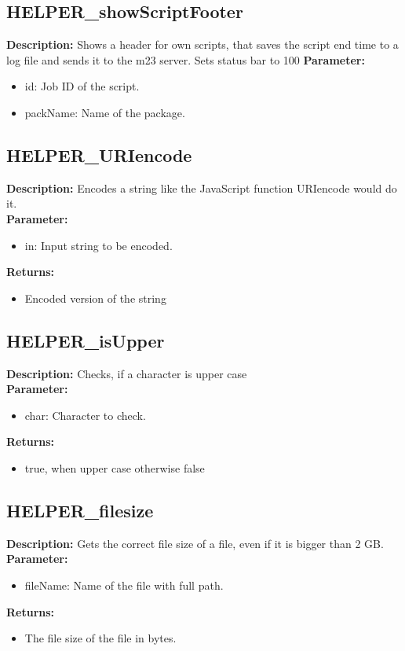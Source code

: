 \subsection{HELPER\_showScriptFooter}
\textbf{Description:} Shows a header for own scripts, that saves the script end time to a log file and sends it to the m23 server. Sets status bar to 100%
\textbf{Parameter:}
\begin{itemize}
\item id: Job ID of the script.
\item packName: Name of the package.
\end{itemize}

\subsection{HELPER\_URIencode}
\textbf{Description:} Encodes a string like the JavaScript function URIencode would do it.\\
\textbf{Parameter:}
\begin{itemize}
\item in: Input string to be encoded.
\end{itemize}
\textbf{Returns:}
\begin{itemize}
\item Encoded version of the string
\end{itemize}

\subsection{HELPER\_isUpper}
\textbf{Description:} Checks, if a character is upper case\\
\textbf{Parameter:}
\begin{itemize}
\item char: Character to check.
\end{itemize}
\textbf{Returns:}
\begin{itemize}
\item true, when upper case otherwise false
\end{itemize}

\subsection{HELPER\_filesize}
\textbf{Description:} Gets the correct file size of a file, even if it is bigger than 2 GB.\\
\textbf{Parameter:}
\begin{itemize}
\item fileName: Name of the file with full path.
\end{itemize}
\textbf{Returns:}
\begin{itemize}
\item The file size of the file in bytes.
\end{itemize}

